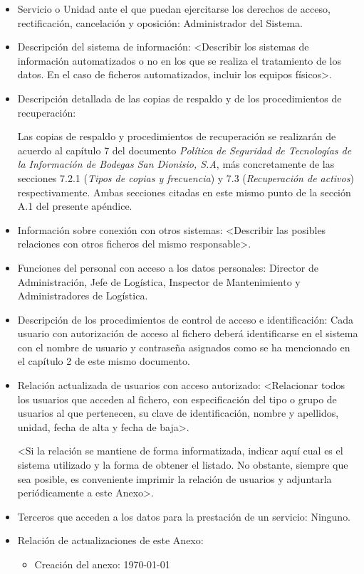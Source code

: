 \documentclass[a4paper,11pt,bibtotoc,noliststotoc]{scrbook}
\begin{document}
\begin{itemize}
\item Servicio o Unidad ante el que puedan ejercitarse los derechos de acceso, rectificación, cancelación y oposición: Administrador del Sistema.

\item Descripción del sistema de información: <Describir los sistemas de información automatizados o no en los que se realiza el tratamiento de los datos. En el caso de ficheros automatizados, incluir los equipos físicos>.

\item Descripción detallada de las copias de respaldo y de los procedimientos de recuperación:

Las copias de respaldo y procedimientos de recuperación se realizarán de acuerdo al capítulo 7 del documento \emph{Política de Seguridad de Tecnologías de la Información de Bodegas San Dionisio, S.A}, más concretamente de las secciones 7.2.1 (\emph{Tipos de copias y frecuencia}) y 7.3 (\emph{Recuperación de activos}) respectivamente. Ambas secciones citadas en este mismo punto de la sección A.1 del presente apéndice.

\item Información sobre conexión con otros sistemas: <Describir las posibles relaciones con otros ficheros del mismo responsable>.

\item Funciones del personal con acceso a los datos personales: Director de Administración, Jefe de Logística, Inspector de Mantenimiento y Administradores de Logística.

\item Descripción de los procedimientos de control de acceso e identificación: Cada usuario con autorización de acceso al fichero deberá identificarse en el sistema con el nombre de usuario y contraseña asignados como se ha mencionado en el capítulo 2 de este mismo documento.

\item Relación actualizada de usuarios con acceso autorizado: <Relacionar todos los usuarios que acceden al fichero, con especificación del tipo o grupo de usuarios al que pertenecen, su clave de identificación, nombre y apellidos, unidad, fecha de alta y fecha de baja>.

<Si la relación se mantiene de forma informatizada, indicar aquí cual es el sistema utilizado y la forma de obtener el listado. No obstante, siempre que sea posible, es conveniente imprimir la relación de usuarios y adjuntarla periódicamente a este Anexo>.

\item Terceros que acceden a los datos para la prestación de un servicio: Ninguno.

\item Relación de actualizaciones de este Anexo: 

	\begin{itemize}
	\item Creación del anexo: \today
	\end{itemize}

\end{itemize}
\end{document}
